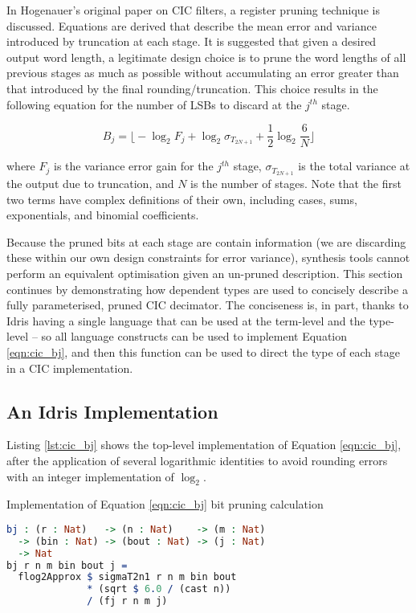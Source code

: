 \documentclass[conference]{IEEEtran}
\begin{document}
In Hogenauer's original paper on CIC filters\cite{hogenauer_81}, a register
pruning technique is discussed. Equations are derived that describe the mean
error and variance introduced by truncation at each stage. It is suggested that
given a desired output word length, a legitimate design choice is to prune the
word lengths of all previous stages as much as possible without accumulating an
error greater than that introduced by the final rounding/truncation. This choice
results in the following equation for the number of LSBs to discard at the
$j^{th}$ stage.

\begin{equation}
  B_j = {\Bigg \lfloor} -\log_2F_j + \log_2\sigma_{T_{2N+1}} +\frac{1}{2}\log_2\frac{6}{N} {\Bigg \rfloor}
  \label{eqn:cic_bj}
\end{equation}

where $F_j$ is the variance error gain for the $j^{th}$ stage,
$\sigma_{T_{2N+1}}$ is the total variance at the output due to truncation, and
$N$ is the number of stages. Note that the first two terms have complex
definitions of their own, including cases, sums, exponentials, and binomial
coefficients\cite{hogenauer_81}.

Because the pruned bits at each stage are contain information (we are discarding
these within our own design constraints for error variance), synthesis tools
cannot perform an equivalent optimisation given an un-pruned description. This
section continues by demonstrating how dependent types are used to concisely
describe a fully parameterised, pruned CIC decimator. The conciseness is, in
part, thanks to Idris having a single language that can be used at the
term-level and the type-level -- so all language constructs can be used to
implement Equation \ref{eqn:cic_bj}, and then this function can be used to
direct the type of each stage in a CIC implementation.

\subsection{An Idris Implementation}

Listing \ref{lst:cic_bj} shows the top-level implementation of Equation
\ref{eqn:cic_bj}, after the application of several logarithmic identities to
avoid rounding errors with an integer implementation of $\log_2$.

\begin{codefig}[h]
  \caption{Implementation of Equation \ref{eqn:cic_bj} bit pruning calculation}
\begin{lstlisting}[language=idris]
bj : (r : Nat)   -> (n : Nat)    -> (m : Nat)
  -> (bin : Nat) -> (bout : Nat) -> (j : Nat)
  -> Nat
bj r n m bin bout j =
  flog2Approx $ sigmaT2n1 r n m bin bout
              * (sqrt $ 6.0 / (cast n))
              / (fj r n m j)
\end{lstlisting}
\label{lst:cic_bj}
\end{codefig}
\end{document}
